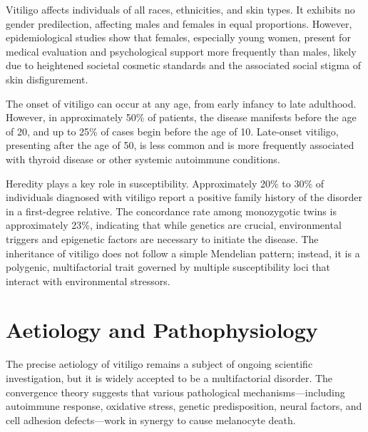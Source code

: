 Vitiligo affects individuals of all races, ethnicities, and skin types. It exhibits no gender predilection, affecting males and females in equal proportions. However, epidemiological studies show that females, especially young women, present for medical evaluation and psychological support more frequently than males, likely due to heightened societal cosmetic standards and the associated social stigma of skin disfigurement.

The onset of vitiligo can occur at any age, from early infancy to late adulthood. However, in approximately 50\% of patients, the disease manifests before the age of 20, and up to 25\% of cases begin before the age of 10. Late-onset vitiligo, presenting after the age of 50, is less common and is more frequently associated with thyroid disease or other systemic autoimmune conditions.

Heredity plays a key role in susceptibility. Approximately 20\% to 30\% of individuals diagnosed with vitiligo report a positive family history of the disorder in a first-degree relative. The concordance rate among monozygotic twins is approximately 23\%, indicating that while genetics are crucial, environmental triggers and epigenetic factors are necessary to initiate the disease. The inheritance of vitiligo does not follow a simple Mendelian pattern; instead, it is a polygenic, multifactorial trait governed by multiple susceptibility loci that interact with environmental stressors.

\section*{Aetiology and Pathophysiology}
The precise aetiology of vitiligo remains a subject of ongoing scientific investigation, but it is widely accepted to be a multifactorial disorder. The convergence theory suggests that various pathological mechanisms—including autoimmune response, oxidative stress, genetic predisposition, neural factors, and cell adhesion defects—work in synergy to cause melanocyte death.

